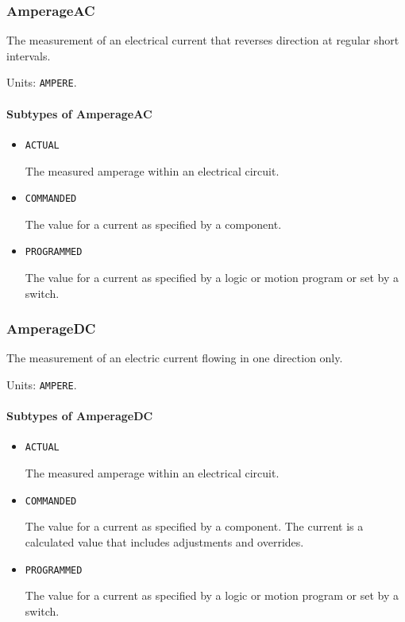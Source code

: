 \subsubsection{AmperageAC}
\label{sec:AmperageAC}



The measurement of an electrical current that reverses direction at regular short intervals.


Units: \texttt{AMPERE}.

\paragraph{Subtypes of AmperageAC}\mbox{}
\label{sec:Subtypes of AmperageAC}

\begin{itemize}

\item \texttt{ACTUAL}


The measured amperage within an electrical circuit.

\item \texttt{COMMANDED}


The value for a current as specified by a component. 

\item \texttt{PROGRAMMED}


The value for a current as specified by a logic or motion program or set by a switch.


\end{itemize}

\subsubsection{AmperageDC}
\label{sec:AmperageDC}



The measurement of an electric current flowing in one direction only.


Units: \texttt{AMPERE}.

\paragraph{Subtypes of AmperageDC}\mbox{}
\label{sec:Subtypes of AmperageDC}

\begin{itemize}

\item \texttt{ACTUAL}


The measured amperage within an electrical circuit.

\item \texttt{COMMANDED}


The value for a current as specified by a component. 
The  current is a calculated value that includes adjustments and overrides.

\item \texttt{PROGRAMMED}


The value for a current as specified by a logic or motion program or set by a switch.


\end{itemize}

